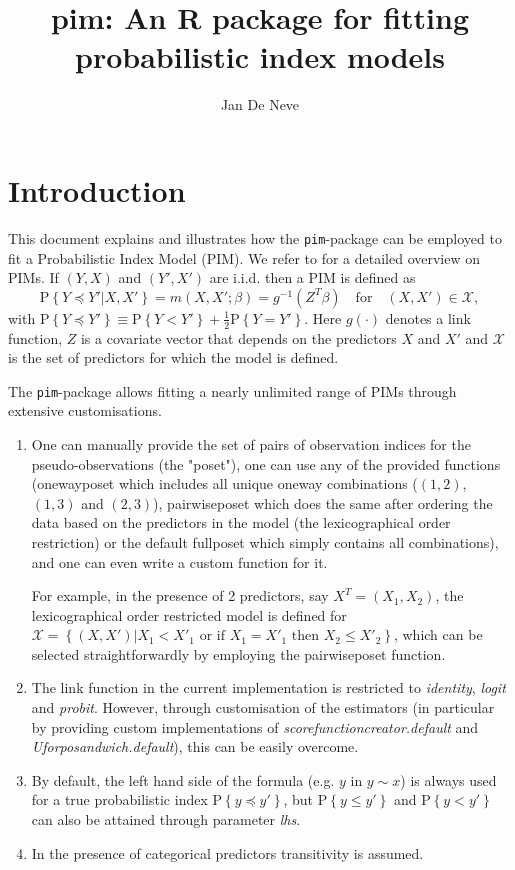 \documentclass[12pt]{article}
\author{Jan De Neve}
\newcommand{\prob}[1]{\text{P}\left\{#1\right\}}
\newcommand{\leqs}{\preccurlyeq}
\begin{document}

\title{pim: An R package for fitting probabilistic index models}

\maketitle
\tableofcontents
\section{Introduction}

This document explains and illustrates how the \texttt{pim}-package can be employed to fit a Probabilistic Index Model (PIM). We refer to \cite{Thas2012} for a detailed overview on PIMs. If $(Y,X)$ and $(Y',X')$ are i.i.d. then a PIM is defined as
\begin{equation}\label{pim}
\prob{Y \leqs Y' | X, X'} = m(X,X';\beta) = g^{-1}(Z^T \beta) \quad \text{for} \quad (X,X') \in \mathcal{X},
\end{equation}
with $\prob{Y \leqs Y'} \equiv  \prob{Y < Y'} + \frac{1}{2} \prob{Y = Y'}$. Here $g(\cdot)$ denotes a link function, $Z$ is a covariate vector that depends on the predictors $X$ and $X'$ and $\mathcal{X}$ is the set of predictors for which the model is defined. 

The \texttt{pim}-package allows fitting a nearly unlimited range of PIMs through extensive customisations.
\begin{enumerate}
\item One can manually provide the set of pairs of observation indices for the pseudo-observations (the "poset"), one can use any of the provided functions (onewayposet which includes all unique oneway combinations ($(1,2)$, $(1,3)$ and $(2,3)$), pairwiseposet which does the same after ordering the data based on the predictors in the model (the lexicographical order restriction) or the default fullposet which simply contains all combinations), and one can even write a custom function for it.

For example, in the presence of 2 predictors, say $X^T = (X_1, X_2)$, the lexicographical order restricted model is defined for $\mathcal{X} = \left\{ (X,X') | X_1 < X'_1 \text{ or if } X_1 = X'_1 \text{ then } X_2 \leq X'_2 \right\}$, which can be selected straightforwardly by employing the pairwiseposet function. 
\item The link function in the current implementation is restricted to \emph{identity}, \emph{logit} and \emph{probit}. However, through customisation of the estimators (in particular by providing custom implementations of \emph{scorefunctioncreator.default} and \emph{Uforposandwich.default}), this can be easily overcome.
\item By default, the left hand side of the formula (e.g. $y$ in $y\sim x$) is always used for a true probabilistic index $\prob{y \leqs y' }$, but $\prob{y \leq y' }$ and $\prob{y < y' }$ can also be attained through parameter \emph{lhs}.
\item In the presence of categorical predictors transitivity is assumed.
\end{enumerate} 
\end{document}

